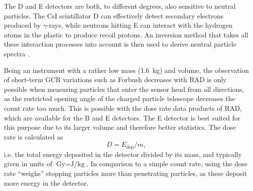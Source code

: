 The D and E detectors are both, to different degrees, also sensitive to neutral particles. The CsI scintillator D can effectively detect secondary electrons produced by $\gamma$-rays, while neutrons hitting E can interact with the hydrogen atoms in the plastic to produce recoil protons. An inversion method that takes all these interaction processes into account is then used to derive neutral particle spectra \citep{Koehler-2011}.

Being an instrument with a rather low mass (\SI{1.6}{\kilogram}) and volume, the observation of short-term \ac{GCR} variations such as Forbush decreases with \ac{RAD} is only possible when measuring particles that enter the sensor head from all directions, as the restricted opening angle of the charged particle telescope decreases the count rate too much. This is possible with the dose rate data products of \ac{RAD}, which are available for the B and E detectors. The E detector is best suited for this purpose due to its larger volume and therefore better statistics.
The dose rate is calculated as
\begin{equation}
D = E_\text{dep}/m,
\end{equation}
i.e. the total energy deposited in the detector divided by its mass, and typically given in units of $\si{\gray} = \si{\joule\per\kilogram}$. In comparison to a simple count rate, using the dose rate ``weighs'' stopping particles more than penetrating particles, as these deposit more energy in the detector.

